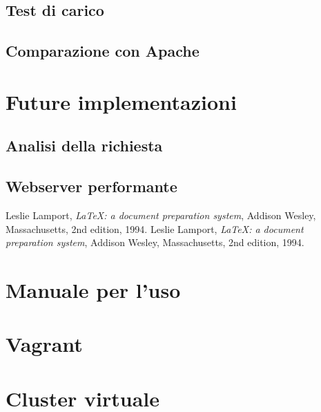 \documentclass[italian]{tktltiki2}
\begin{document}
\subsection{Test di carico}
\subsection{Comparazione con Apache}
\newpage
\section{Future implementazioni}
\subsection{Analisi della richiesta}
\subsection{Webserver performante}


%
%
% 
%


\newpage
%
%
\renewcommand{\refname}{\normalfont\selectfont\normalsize\textbf{Annotazioni}} 
\begin{thebibliography}{9}
  Leslie Lamport,
  \emph{\LaTeX: a document preparation system},
  Addison Wesley, Massachusetts,
  2nd edition,
  1994.
  Leslie Lamport,
  \emph{\LaTeX: a document preparation system},
  Addison Wesley, Massachusetts,
  2nd edition,
  1994.
  
\end{thebibliography}

\newpage
\appendix
 
\section{Manuale per l'uso}

\section{Vagrant}

\section{Cluster virtuale}
\end{document}

